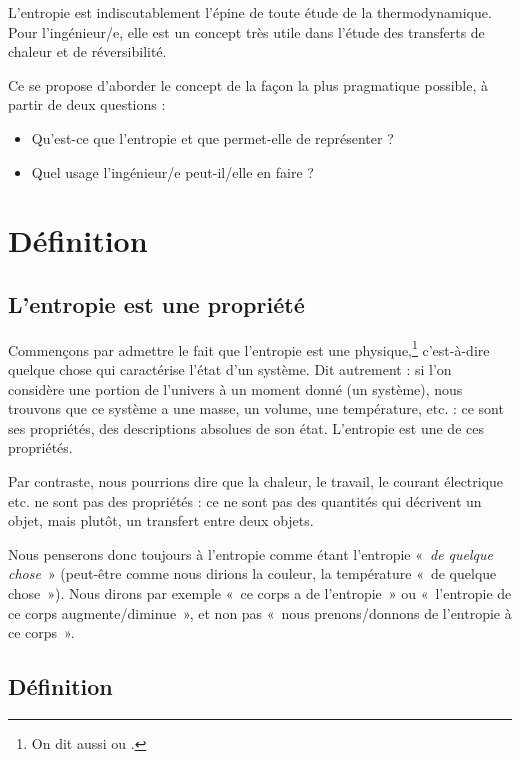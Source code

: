 
	L’entropie est indiscutablement l’épine de toute étude de la thermodynamique. Pour l’ingénieur/e, elle est un concept très utile dans l’étude des transferts de chaleur et de réversibilité.

	Ce \courshuit se propose d’aborder le concept de la façon la plus pragmatique possible, à partir de deux questions :
	\begin{itemize}
		\item Qu’est-ce que l’entropie et que permet-elle de représenter ?
		\item Quel usage l’ingénieur/e peut-il/elle en faire ?
	\end{itemize} \dontbreakpage \vspace{2em}


\section{Définition}

	\subsection{L’entropie est une propriété}
	\label{ch_entropie_propriete}
	
		Commençons par admettre le fait que l’entropie est une  physique,\footnote{On dit aussi  ou .} c’est-à-dire quelque chose qui caractérise l’état d’un système. Dit autrement : si l’on considère une portion de l’univers à un moment donné (un système), nous trouvons que ce système a une masse, un volume, une température, etc. : ce sont ses propriétés, des descriptions absolues de son état. L’entropie est une de ces propriétés.
		
		Par contraste, nous pourrions dire que la chaleur, le travail, le courant électrique etc. ne sont pas des propriétés : ce ne sont pas des quantités qui décrivent un objet, mais plutôt, un transfert entre deux objets.

		Nous penserons donc toujours à l’entropie comme étant l’entropie «~\emph{de quelque chose}~» (peut-être comme nous dirions la couleur, la température «~de quelque chose~»). Nous dirons par exemple «~ce corps a de l’entropie~» ou «~l’entropie de ce corps augmente/diminue~», et non pas «~nous prenons/donnons de l’entropie à ce corps~».
	
	\subsection{Définition}
	
